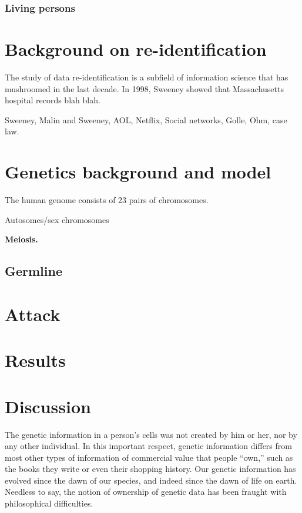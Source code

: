 \documentclass{article}
\begin{document}
\subsubsection{Living persons}


\section{Background on re-identification}
The study of data re-identification is a subfield of information science that has mushroomed in the last decade. In 1998, Sweeney \cite{sweeney} showed that Massachusetts hospital records blah blah. 

 Sweeney, Malin and Sweeney, AOL, Netflix, Social networks, Golle, Ohm, case law.

\section{Genetics background and model}
The human genome consists of 23 pairs of chromosomes. 

Autosomes/sex chromosomes

{\bf Meiosis.}

\subsection{Germline}

\section{Attack}

\section{Results}

\section{Discussion}
The genetic information in a person's cells was not created by him or her, nor by any other individual. In this important respect, genetic information differs from most other types of information of commercial value that people ``own,'' such as the books they write or even their shopping history. Our genetic information has evolved since the dawn of our species, and indeed since the dawn of life on earth. Needless to say, the notion of ownership of genetic data has been fraught with philosophical difficulties.
\end{document}
